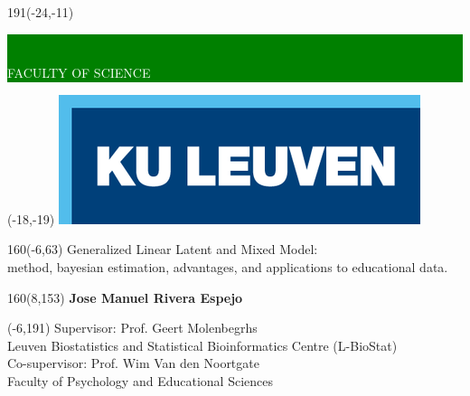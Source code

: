 \documentclass[12pt,a4paper,oneside]{book}
\begin{document}
%
\graphicspath{{./images/main/}} 	          %
%
\thispagestyle{empty}
\newcommand{\form}[1]{\scalebox{1.087}{\boldmath{#1}}}
\sffamily
%
\begin{textblock}{191}(-24,-11)
\colorbox{green}{\hspace{139mm}\ \parbox[c][18truemm]{52mm}{\textcolor{white}{FACULTY OF SCIENCE}}}
\end{textblock}
%
\begin{textblock}{70}(-18,-19)
\textblockcolour{}
\includegraphics[height=19.8truemm]{LogoKULeuven}
\end{textblock}
%
\begin{textblock}{160}(-6,63)
\textblockcolour{}
\vspace{-\parskip}
\flushleft
\fontsize{40}{42}\selectfont \textcolor{bluetitle}{Generalized Linear Latent and Mixed Model:}\\[1.5mm]
\fontsize{20}{22}\selectfont method, bayesian estimation, advantages, and applications to educational data. \\
\end{textblock}
%
\begin{textblock}{160}(8,153)
\textblockcolour{}
\vspace{-\parskip}
\flushright
\fontsize{14}{16}\selectfont \textbf{Jose Manuel Rivera Espejo}
\end{textblock}
%
\begin{textblock}{70}(-6,191)
\textblockcolour{}
\vspace{-\parskip}
\flushleft
Supervisor: Prof. Geert Molenbegrhs \\[-2pt]
\textcolor{blueaff}{ Leuven Biostatistics and Statistical Bioinformatics Centre (L-BioStat) }\\[5pt]
Co-supervisor: Prof. Wim Van den Noortgate \\[-2pt]
\textcolor{blueaff}{ Faculty of Psychology and Educational Sciences }\\[5pt]
\end{textblock}
\end{document}
